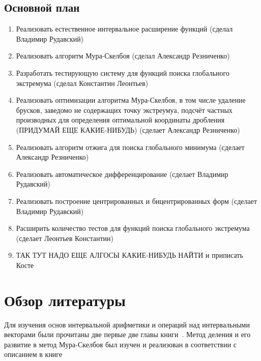 \documentclass[a4paper,12pt]{extarticle}
\begin{document}
\subsection*{Основной план}
\begin{enumerate}
	\item Реализовать естественное интервальное расширение функций (сделал Владимир Рудавский) 
	\item Реализовать алгоритм Мура-Скелбоя (сделал Александр Резниченко)
	\item Разработать тестирующую систему для функций поиска глобального экстремума (сделал Константин Леонтьев)
	\item Реализовать оптимизации алгоритма Мура-Скелбоя, в том числе удаление брусков, заведомо не содержащих точку экстреумуа, подсчёт частных производных для определения оптимальной координаты дробления (ПРИДУМАЙ ЕЩЕ КАКИЕ-НИБУДЬ) (сделает Александр Резниченко)
	\item Реализовать алгоритм отжига для поиска глобального минимума (сделает Александр Резниченко)
	\item Реализовать автоматическое дифференцирование (сделает Владимир Рудавский)
	\item Реализовать построение центрированных и бицентрированных форм (сделает Владимир Рудавский)
	\item Расширить количество тестов для функций поиска глобального экстремума (сделает Леонтьев Константин)
	\item ТАК ТУТ НАДО ЕЩЕ АЛГОСЫ КАКИЕ-НИБУДЬ НАЙТИ и приписать Косте
\end{enumerate}

\section{Обзор литературы}
Для изучения основ интервальной арифметики и операций над интервальными векторами были прочитаны две первые две главы книги~\cite{interval-analysis}. Метод деления и его развитие в метод Мура-Скелбоя был изучен и реализован в соответствии с описанием в книге~\cite{ratschek1984computer}

	
\newpage 
\printbibliography[heading=bibintoc] 

	
	
\end{document}
